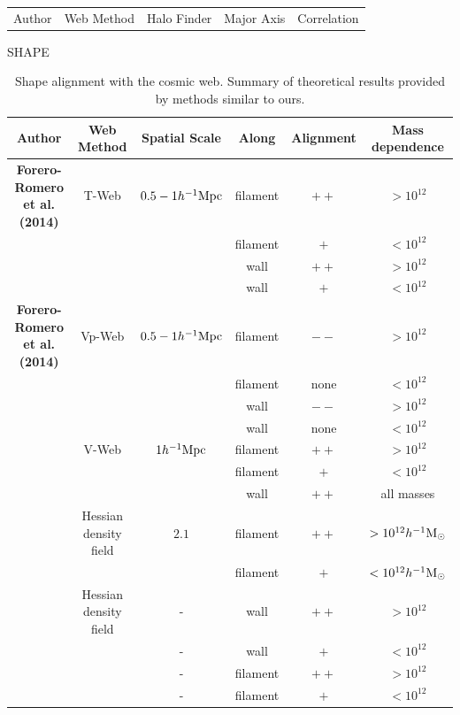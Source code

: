 \documentclass[useAMS,usenatbib]{mn2e}
\newcommand{\hMpc}{{\ifmmode{h^{-1}{\rm Mpc}}\else{$h^{-1}$Mpc }\fi}}
\newcommand{\hMsun}{{\ifmmode{h^{-1}{\rm
        {M_{\odot}}}}\else{$h^{-1}{\rm{M_{\odot}}}$}\fi}}
\begin{document}
\begin{table}
\begin{tabular}{lllll}
Author & Web Method & Halo Finder & Major Axis & Correlation\\
\end{tabular}
SHAPE
\end{table}

\begin{table}
\begin{tabular}{cccccc}\hline\hline
Author & Web Method & Spatial Scale & Along &
Alignment & Mass dependence\\\hline

{\bf Forero-Romero et al. (2014)} & T-Web & $0.5-1 \hMpc$ & 
filament &$++$ & $>10^{12}$\hMsun\\
&   & & 
filament & $+$ & $<10^{12}$\hMsun\\

&   & & 
wall & $++$ & $>10^{12}$\hMsun\\

&   & & 
wall & $+$ & $<10^{12}$\hMsun\\\hline

{\bf Forero-Romero et al. (2014)} & Vp-Web & $0.5-1 \hMpc$ & 
filament &$--$ & $>10^{12}$\hMsun\\
&   & & 
filament & none & $<10^{12}$\hMsun\\
&   & & 
wall & $--$ & $>10^{12}$\hMsun\\

&   & & 
wall & none & $<10^{12}$\hMsun\\\hline


\cite{Libeskind2013} & V-Web & $1 \hMpc$ & 
filament &$++$ & $>10^{12}$\hMsun\\
&   & & 
filament &$+$ & $<10^{12}$\hMsun\\
&   & & 
wall & $++$ & all masses\\\hline

\cite{Zhang2009}  & Hessian density field &  $2.1$\hMpc & 
filament & $++$ & $>10^{12}\hMsun$\\

& &  & 
filament & $+$ & $<10^{12}\hMsun$\\\hline

\cite{AragonCalvo2007} & Hessian density field & - &
wall & $++$ & $>10^{12}$\hMsun\\

& & - &
wall & $+$ & $<10^{12}$\hMsun\\

& & - &
filament& $++$ & $>10^{12}$\hMsun\\

& & - &
filament& $+$ & $<10^{12}$\hMsun\\\hline \hline

\end{tabular}\\
\caption{Shape alignment with the cosmic web. Summary of theoretical
  results provided by methods similar to ours.}
\end{table}
\end{document}
